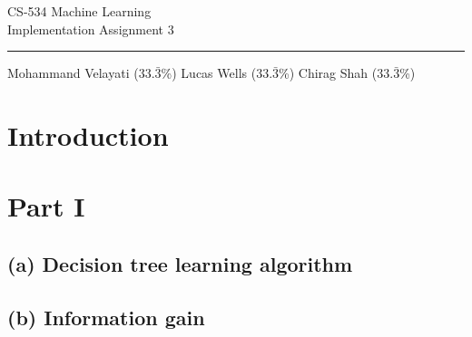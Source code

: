 \documentclass{article}
\begin{document}
\begin{center}
	{\huge CS-534 Machine Learning} \\ \vspace{2mm}
	{\Large Implementation Assignment 3} \\ \vspace{2mm} \hrule \vspace{3mm}
	{\normalsize Mohammand Velayati ($33.\bar{3}$\%) \hspace{3mm}  Lucas Wells ($33.\bar{3}$\%) \hspace{3mm}  Chirag Shah ($33.\bar{3}$\%)}
\end{center}

\section{Introduction}

\section{Part I}

\subsection{(a) Decision tree learning algorithm}

\subsection{(b) Information gain}
\end{document}
